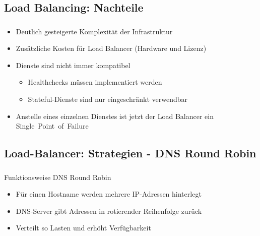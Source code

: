 \subsection{Load Balancing: Nachteile}
\begin{frame}
    \frametitle{\insertsection}
    \framesubtitle{\insertsubsection}
    
    \begin{itemize}
    	\item Deutlich gesteigerte Komplexität der Infrastruktur
    	\item Zusätzliche Kosten für Load Balancer (Hardware und Lizenz)%
    	\item Dienste sind nicht immer kompatibel
		\begin{itemize}
			\item Healthchecks müssen implementiert werden
			\item Stateful-Dienste sind nur eingeschränkt verwendbar
		\end{itemize}
    	\item Anstelle eines einzelnen Dienstes ist jetzt der Load Balancer ein Single~Point~of~Failure
    \end{itemize}
\end{frame}

\subsection{Load-Balancer: Strategien - DNS Round Robin}
\begin{frame}
    \frametitle{\insertsection}
    \framesubtitle{\insertsubsection}
    \begin{block}{Funktionsweise DNS Round Robin}
    \begin{itemize}
        \item Für einen Hostname werden mehrere IP-Adressen hinterlegt
        \item DNS-Server gibt Adressen in rotierender Reihenfolge zurück
        \item Verteilt so Lasten und erhöht Verfügbarkeit
    \end{itemize}
    \end{block}
\end{frame}


